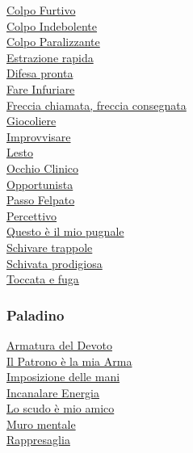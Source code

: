 \begin{multicols}{3}
{\begin{flushleft}
\hyperlink{Colpo Furtivo}{Colpo Furtivo}\\
\hyperlink{Colpo Indebolente}{Colpo Indebolente}\\
\hyperlink{Colpo Paralizzante}{Colpo Paralizzante}\\
\hyperlink{Estrazione rapida}{Estrazione rapida}\\
\hyperlink{Difesa pronta}{Difesa pronta}\\
\hyperlink{Fare Infuriare}{Fare Infuriare}\\
\hyperlink{Freccia chiamata, freccia consegnata}{Freccia chiamata, freccia consegnata}\\
\hyperlink{Giocoliere}{Giocoliere}\\
\hyperlink{Improvvisare}{Improvvisare}\\
\hyperlink{Lesto}{Lesto}\\
\hyperlink{Occhio Clinico}{Occhio Clinico}\\
\hyperlink{Opportunista}{Opportunista}\\
\hyperlink{Passo Felpato}{Passo Felpato}\\
\hyperlink{Percettivo}{Percettivo}\\
\hyperlink{Questo è il mio pugnale}{Questo è il mio pugnale}\\
\hyperlink{Schivare trappole}{Schivare trappole}\\
\hyperlink{Schivata prodigiosa}{Schivata prodigiosa}\\
\hyperlink{Toccata e fuga}{Toccata e fuga}

\titlespacing*{\subsubsection}{0pt}{0.5em}{0.5em}\subsubsection*{Paladino}

\hyperlink{Armatura del Devoto}{Armatura del Devoto}\\
\hyperlink{Il Patrono è la mia Arma}{Il Patrono è la mia Arma}\\
\hyperlink{Imposizione delle mani}{Imposizione delle mani}\\
\hyperlink{Incanalare Energia}{Incanalare Energia}\\
\hyperlink{Lo scudo è mio amico}{Lo scudo è mio amico}\\
\hyperlink{Muro mentale}{Muro mentale}\\
\hyperlink{Rappresaglia}{Rappresaglia}\\


\end{flushleft}}
\end{multicols}
